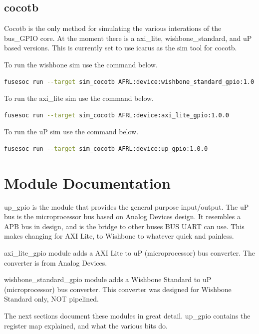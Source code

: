 \subsection{cocotb}
\par
Cocotb is the only method for simulating the various interations of the bus\_GPIO core. At the moment there is a
axi\_lite, wishbone\_standard, and uP based versions. This is currently set to use icarus as the sim tool for cocotb.

\par
To run the wishbone sim use the command below.
\begin{lstlisting}[language=bash]
fusesoc run --target sim_cocotb AFRL:device:wishbone_standard_gpio:1.0.0
\end{lstlisting}

\par
To run the axi\_lite sim use the command below.
\begin{lstlisting}[language=bash]
fusesoc run --target sim_cocotb AFRL:device:axi_lite_gpio:1.0.0
\end{lstlisting}

\par
To run the uP sim use the command below.
\begin{lstlisting}[language=bash]
fusesoc run --target sim_cocotb AFRL:device:up_gpio:1.0.0
\end{lstlisting}

\newpage

\section{Module Documentation} \label{Module Documentation}

\par
up\_gpio is the module that provides the general purpose input/output.
The uP bus is the microprocessor bus based on Analog Devices design. It resembles a APB bus in design,
and is the bridge to other buses BUS UART can use. This makes changing for AXI Lite, to Wishbone to whatever
quick and painless.

\par
axi\_lite\_gpio module adds a AXI Lite to uP (microprocessor) bus converter. The converter is
from Analog Devices.

\par
wishbone\_standard\_gpio module adds a Wishbone Standard to uP (microprocessor) bus converter. This
converter was designed for Wishbone Standard only, NOT pipelined.

\vspace{15mm}
\par
The next sections document these modules in great detail. up\_gpio contains the register map explained, and what the various bits do.

